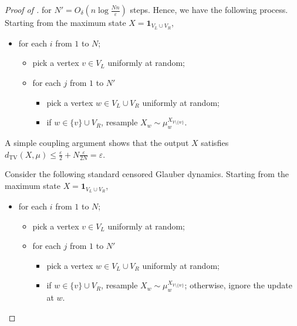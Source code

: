 \documentclass[11pt,a4paper]{article}
\newcommand{\DTV}[2]{d_{\mathrm{TV}}\left({#1},{#2}\right)}
\renewcommand{\epsilon}{\varepsilon}
\theoremstyle{definition}
\def\*#1{\mathbf{#1}} %
\begin{document}
\begin{proof}[Proof of ]
 for $N' = O_\delta(n \log \frac{Nn}{\epsilon})$ steps. Hence, we have the following process.
 Starting from the maximum state $X = \*1_{V_L \cup V_R}$,
 \begin{itemize}
    \item for each $i$ from $1$ to $N$;
\begin{itemize}
    \item pick a vertex $v \in V_L$ uniformly at random;
    \item for each $j$ from $1$ to $N'$
\begin{itemize}
    \item pick a vertex $w \in  V_L \cup V_R$ uniformly at random;
    \item if $w \in \{v\} \cup V_R$, resample $X_w \sim \mu_w^{X_{V \setminus \{w\}}}$.
\end{itemize}
\end{itemize} 
 \end{itemize}
A simple coupling argument shows that the output $X$ satisfies $\DTV{X}{\mu}\leq \frac{\epsilon}{2} + N \frac{\epsilon}{2N} = \epsilon$.

Consider the following standard censored Glauber dynamics. 
Starting from the maximum state $X = \*1_{V_L \cup V_R}$,
 \begin{itemize}
    \item for each $i$ from $1$ to $N$;
\begin{itemize}
    \item pick a vertex $v \in V_L$ uniformly at random;
    \item for each $j$ from $1$ to $N'$
\begin{itemize}
    \item pick a vertex $w \in  V_L \cup V_R$ uniformly at random;
    \item if $w \in \{v\} \cup V_R$, resample $X_w \sim \mu_w^{X_{V \setminus \{w\}}}$; otherwise, ignore the update at $w$.
\end{itemize}
\end{itemize} 
\end{itemize}



\end{proof}
\end{document}
